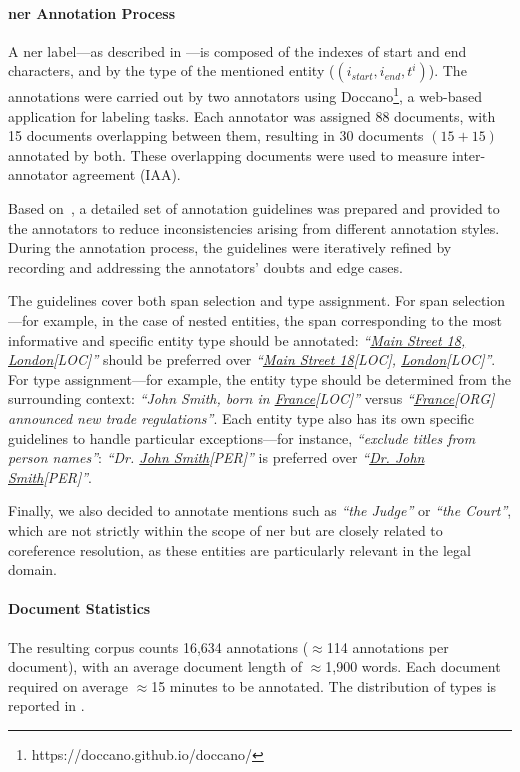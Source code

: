 \paragraph{\ac{ner} Annotation Process}
A \ac{ner} label---as described in ---is composed of the indexes of start and end characters, and by the type of the mentioned entity ($(i_{start},i_{end},t^i)$).
The annotations were carried out by two annotators using Doccano\footnote{https://doccano.github.io/doccano/}, a web-based application for labeling tasks. Each annotator was assigned 88 documents, with 15 documents overlapping between them, resulting in 30 documents $(15 + 15)$ annotated by both. These overlapping documents were used to measure inter-annotator agreement (IAA).


Based on~\cite{jha2017all}, a detailed set of annotation guidelines was prepared and provided to the annotators to reduce inconsistencies arising from different annotation styles. During the annotation process, the guidelines were iteratively refined by recording and addressing the annotators' doubts and edge cases.

The guidelines cover both span selection and type assignment.  
For span selection---for example, in the case of nested entities, the span corresponding to the most informative and specific entity type should be annotated: \textit{``\underline{Main Street 18, London}[LOC]''} should be preferred over \textit{``\underline{Main Street 18}[LOC], \underline{London}[LOC]''}.
For type assignment---for example, the entity type should be determined from the surrounding context: \textit{``John Smith, born in \underline{France}[LOC]''} versus \textit{``\underline{France}[ORG] announced new trade regulations''}.  
Each entity type also has its own specific guidelines to handle particular exceptions---for instance, \textit{``exclude titles from person names''}: \textit{``Dr. \underline{John Smith}[PER]''} is preferred over \textit{``\underline{Dr. John Smith}[PER]''}.  

Finally, we also decided to annotate mentions such as \textit{``the Judge''} or \textit{``the Court''}, which are not strictly within the scope of \ac{ner} but are closely related to coreference resolution, as these entities are particularly relevant in the legal domain.




\paragraph{Document Statistics}
The resulting corpus counts 16,634 annotations ($\approx$114 annotations per document), with an average document length of $\approx$1,900 words. Each document required on average $\approx$15 minutes to be annotated. The distribution of types is reported in .

